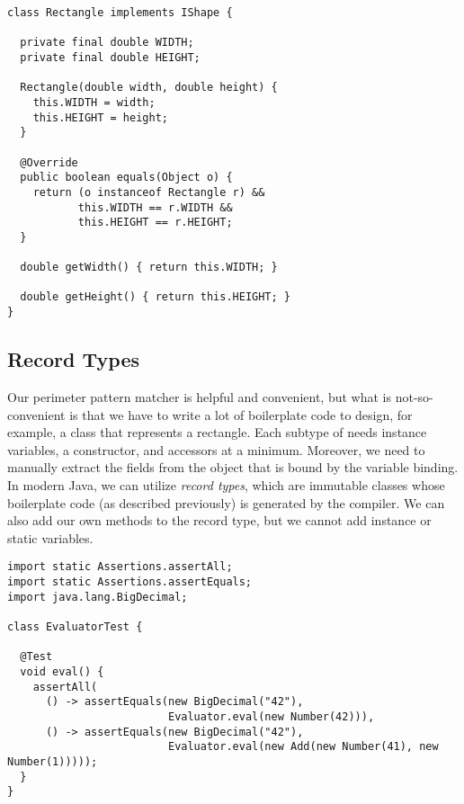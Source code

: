 \begin{lstlisting}[language=MyJava]
class Rectangle implements IShape {

  private final double WIDTH;
  private final double HEIGHT;

  Rectangle(double width, double height) {
    this.WIDTH = width;
    this.HEIGHT = height;
  }

  @Override
  public boolean equals(Object o) {
    return (o instanceof Rectangle r) &&
           this.WIDTH == r.WIDTH &&
           this.HEIGHT == r.HEIGHT;
  }

  double getWidth() { return this.WIDTH; }

  double getHeight() { return this.HEIGHT; }
}
\end{lstlisting}


\subsection{Record Types}

Our perimeter pattern matcher is helpful and convenient, but what is not-so-convenient is that we have to write a lot of boilerplate code to design, for example, a class that represents a rectangle. Each subtype of  needs instance variables, a constructor, and accessors at a minimum. Moreover, we need to manually extract the fields from the object that is bound by the variable binding. In modern Java, we can utilize \emph{record types}, which are immutable classes whose boilerplate code (as described previously) is generated by the compiler. We can also add our own methods to the record type, but we cannot add instance or static variables.


\begin{lstlisting}[language=MyJava]
import static Assertions.assertAll;
import static Assertions.assertEquals;
import java.lang.BigDecimal;

class EvaluatorTest {

  @Test
  void eval() {
    assertAll(
      () -> assertEquals(new BigDecimal("42"),
                         Evaluator.eval(new Number(42))),
      () -> assertEquals(new BigDecimal("42"),
                         Evaluator.eval(new Add(new Number(41), new Number(1)))));
  }
}
\end{lstlisting}

